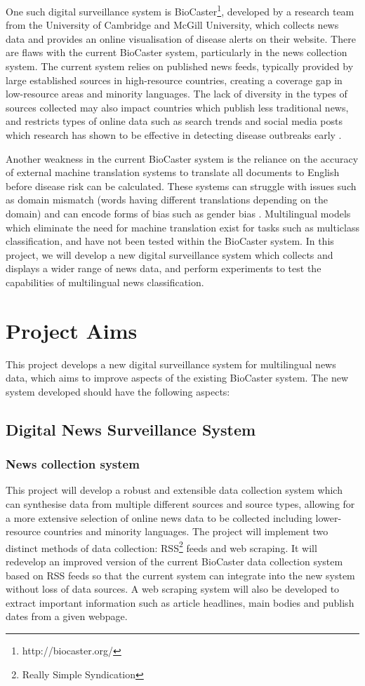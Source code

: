 \documentclass{l4proj}
\begin{document}
One such digital surveillance system is BioCaster\footnote{http://biocaster.org/}, developed by a research team from the University of Cambridge and McGill University, which collects news data and provides an online visualisation of disease alerts on their website. There are flaws with the current BioCaster system, particularly in the news collection system. The current system relies on published news feeds, typically provided by large established sources in high-resource countries, creating a coverage gap in low-resource areas and minority languages. The lack of diversity in the types of sources collected may also impact countries which publish less traditional news, and restricts types of online data such as search trends and social media posts which research has shown to be effective in detecting disease outbreaks early \citep{seo2017methods}. \par
Another weakness in the current BioCaster system is the reliance on the accuracy of external machine translation systems to translate all documents to English before disease risk can be calculated. These systems can struggle with issues such as domain mismatch (words having different translations depending on the domain) \citep{koehn2017six} and can encode forms of bias such as gender bias \citep{stanovsky2019evaluating}. Multilingual models which eliminate the need for machine translation exist for tasks such as multiclass classification, and have not been tested within the BioCaster system. In this project, we will develop a new digital surveillance system which collects and displays a wider range of news data, and perform experiments to test the capabilities of multilingual news classification.

\section{Project Aims}
This project develops a new digital surveillance system for multilingual news data, which aims to improve aspects of the existing BioCaster system. The new system developed should have the following aspects: 
\subsection{Digital News Surveillance System} \hfill \par
\subsubsection{News collection system}
This project will develop a robust and extensible data collection system which can synthesise data from multiple different sources and source types, allowing for a more extensive selection of online news data to be collected including lower-resource countries and minority languages. The project will implement two distinct methods of data collection: RSS\footnote{Really Simple Syndication} feeds and web scraping. It will redevelop an improved version of the current BioCaster data collection system based on RSS feeds so that the current system can integrate into the new system without loss of data sources. A web scraping system will also be developed to extract important information such as article headlines, main bodies and publish dates from a given webpage.
\end{document}
